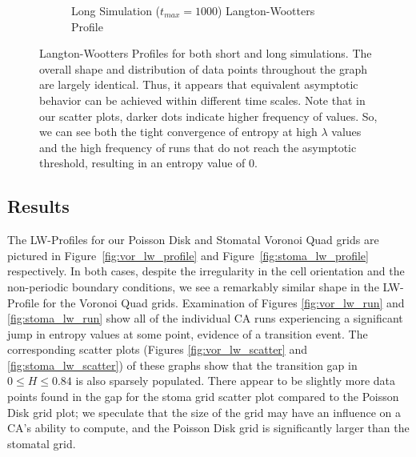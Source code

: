 \documentclass[a4paper,11pt,twoside]{report}
\begin{document}
\begin{figure}[htp]
\begin{subfigure}[t]{0.6\textwidth}
  \caption{Long Simulation ($t_{max} = 1000$) Langton-Wootters Profile}
  \label{fig:lw_profile_long}
  \end{subfigure}
\caption[Langton-Wootters Profile for Short and Long Simulations]{
  Langton-Wootters Profiles for both short and long simulations. The overall shape and distribution of data points throughout the graph are largely identical. Thus, it appears that equivalent asymptotic behavior can be achieved within different time scales. Note that in our scatter plots, darker dots indicate higher frequency of values. So, we can see both the tight convergence of entropy at high $\lambda$ values and the high frequency of runs that do not reach the asymptotic threshold, resulting in an entropy value of 0.
}
\label{fig:lw_reg_short_long}
\end{figure}

\subsection*{Results}

The LW-Profiles for our Poisson Disk and Stomatal Voronoi Quad grids are pictured in Figure~\ref{fig:vor_lw_profile} and Figure~\ref{fig:stoma_lw_profile} respectively. In both cases, despite the irregularity in the cell orientation and the non-periodic boundary conditions, we see a remarkably similar shape in the LW-Profile for the Voronoi Quad grids. Examination of Figures \ref{fig:vor_lw_run} and \ref{fig:stoma_lw_run} show all of the individual CA runs experiencing a significant jump in entropy values at some point, evidence of a transition event. The corresponding scatter plots (Figures \ref{fig:vor_lw_scatter} and \ref{fig:stoma_lw_scatter}) of these graphs show that the transition gap in $0 \le H \le 0.84$ is also sparsely populated. There appear to be slightly more data points found in the gap for the stoma grid scatter plot compared to the Poisson Disk grid plot; we speculate that the size of the grid may have an influence on a CA's ability to compute, and the Poisson Disk grid is significantly larger than the stomatal grid. 
\end{document}
